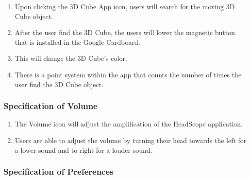 \documentclass[12pt]{article}
\begin{document}
\begin{enumerate}
\item Upon clicking the 3D Cube App icon, users will search for the moving 3D Cube object. 
\item After the user find the 3D Cube, the users will lower the magnetic button that is installed in the Google Cardboard.
\item This will change the 3D Cube's color.
\item There is a point system within the app that counts the number of times the user find the 3D Cube object.
\end{enumerate}

\subsubsection{Specification of Volume}


\begin{enumerate}
\item The Volume icon will adjust the amplification of the HeadScope application. 
\item Users are able to adjust the volume by turning their head towards the left for a lower sound and to right for a louder sound.
\end{enumerate}

\subsubsection{Specification of Preferences}

\end{document}
